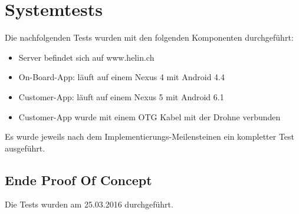 \newpage
\chapter{Systemtests}

Die nachfolgenden Tests wurden mit den folgenden Komponenten durchgeführt:

\begin{itemize}
	\item Server befindet sich auf www.helin.ch
	\item On-Board-App: läuft auf einem Nexus 4 mit Android 4.4
	\item Customer-App: läuft auf einem Nexus 5 mit Android 6.1
	\item Customer-App wurde mit einem OTG Kabel mit der Drohne verbunden
\end{itemize}

Es wurde jeweils nach dem Implementierungs-Meilensteinen ein kompletter Test ausgeführt.

\section{Ende Proof Of Concept}

Die Tests wurden am 25.03.2016 durchgeführt.

